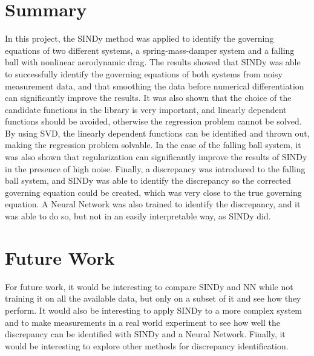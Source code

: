 ﻿\documentclass[12pt,a4paper]{article}
\begin{document}
\section{Summary}
In this project, the SINDy method was applied to identify the governing equations of
two different systems, a spring-mass-damper system and a falling ball with
nonlinear aerodynamic drag. The results showed that SINDy was able to successfully
identify the governing equations of both systems from noisy measurement data, 
and that smoothing the data before numerical differentiation can significantly 
improve the results. It was also shown that the choice of the candidate functions 
in the library is very important, and linearly dependent functions should be avoided,
otherwise the regression problem cannot be solved. By using SVD, the
linearly dependent functions can be identified and thrown out, making the regression
problem solvable. In the case of the falling ball system, it was also shown that
regularization can significantly improve the results of SINDy in the presence of
high noise. Finally, a discrepancy was introduced to the falling ball system, 
and SINDy was able to identify the discrepancy so the corrected governing equation
could be created,
which was very close to the true governing equation. A Neural Network was also trained
to identify the discrepancy, and it was able to do so, but not in an easily interpretable
way, as SINDy did. 

\section{Future Work}
For future work, it would be interesting to compare SINDy and NN while not training
it on all the available data, but only on a subset of it and see how they perform.
It would also be interesting to apply SINDy to a more complex system and
to make measurements in a real world experiment to see how well the discrepancy
can be identified with SINDy and a Neural Network. Finally, it would be interesting
to explore other methods for discrepancy identification.


\newpage
\printbibliography[title={References}]
\end{document}
